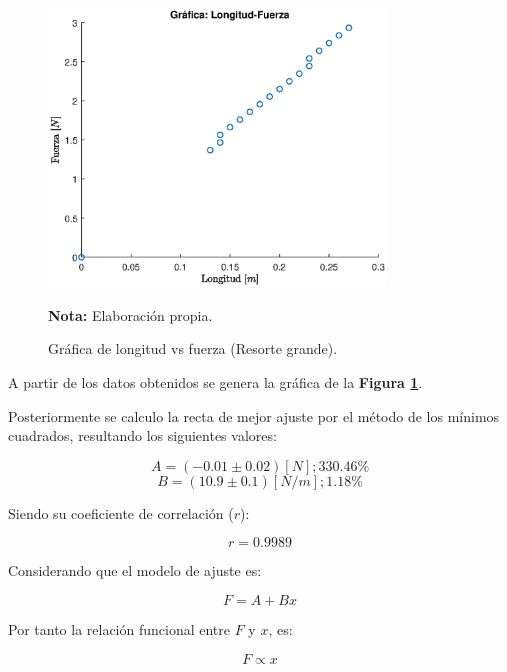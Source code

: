 \documentclass[letter,11pt]{article}
\newcommand{\source}[1]{\vspace{-11pt} \caption*{\small{\textbf{Nota:} {#1}}}}
\begin{document}
\begin{figure}
\centering
\includegraphics[width=0.80\textwidth]{resources/m2.eps}
\caption{Gráfica de longitud vs fuerza (Resorte grande).}
\label{figura4}
\source{Elaboración propia.}
\end{figure}

A partir de los datos obtenidos se genera la gráfica de la
\textbf{Figura \ref{figura4}}.

Posteriormente se calculo la recta de mejor ajuste por el método de los mínimos
cuadrados, resultando los siguientes valores:

\begin{equation*}
    A = (-0.01 \pm 0.02) [N]; 330.46\%
\end{equation*}
\begin{equation*}
    B = (10.9 \pm 0.1) [N/m]; 1.18\%
\end{equation*}
\vspace{0.10cm}

Siendo su coeficiente de correlación ($r$):

\begin{equation*}
    r = 0.9989
\end{equation*}
\vspace{0.10cm}

Considerando que el modelo de ajuste es:

\begin{equation*}
    F = A + B x
\end{equation*}
\vspace{0.10cm}

Por tanto la relación funcional entre $F$ y $x$, es:

\begin{equation*}
    F \propto x
\end{equation*}
\vspace{0.10cm}
\end{document}
